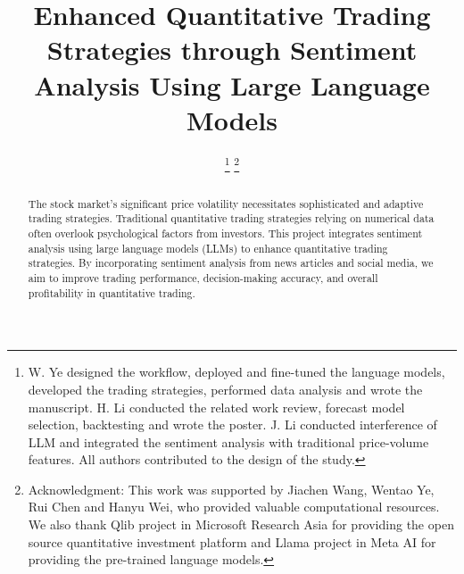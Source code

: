 \documentclass[conference]{IEEEtran}
\begin{document}
\title{Enhanced Quantitative Trading Strategies through Sentiment Analysis Using Large Language Models}

\author{
    \and
    \and
    \thanks{W. Ye designed the workflow, deployed and fine-tuned the language models, developed the trading strategies, performed data analysis and wrote the manuscript.
    H. Li conducted the related work review, forecast model selection, backtesting and wrote the poster.
    J. Li conducted interference of LLM and integrated the sentiment analysis with traditional price-volume features.
    All authors contributed to the design of the study.
    }
    \thanks{Acknowledgment: This work was supported by Jiachen Wang, Wentao Ye, Rui Chen and Hanyu Wei, who provided valuable computational resources. 
    We also thank Qlib project in Microsoft Research Asia for providing the open source quantitative investment platform and Llama project in Meta AI for providing the pre-trained language models.}
}

\maketitle

\begin{abstract}
The stock market's significant price volatility necessitates sophisticated and adaptive trading strategies. 
Traditional quantitative trading strategies relying on numerical data often overlook psychological factors from investors.
This project integrates sentiment analysis using large language models (LLMs) to enhance quantitative trading strategies. 
By incorporating sentiment analysis from news articles and social media, we aim to improve trading performance, decision-making accuracy, and overall profitability in quantitative trading.
\end{abstract}
\end{document}
